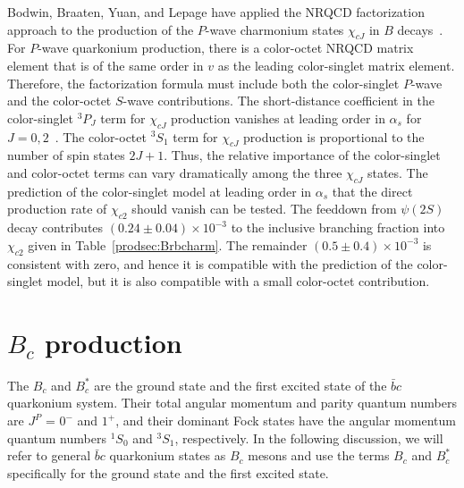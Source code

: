 Bodwin, Braaten, Yuan, and Lepage have applied the NRQCD factorization
approach to the production of the $P$-wave charmonium states $\chi_{cJ}$
in $B$ decays~\cite{Bodwin:1992qr}. For $P$-wave quarkonium production,
there is a color-octet NRQCD matrix element that is of the same order in
$v$ as the leading color-singlet matrix element. Therefore, the
factorization formula must include both the color-singlet $P$-wave and
the color-octet $S$-wave contributions. The short-distance coefficient
in the color-singlet ${}^3P_J$ term for $\chi_{cJ}$ production
vanishes at leading order in $\alpha_s$ for
$J=0,2$~\cite{Kuhn:1979zb,Kuhn:1983ar}. The color-octet ${}^3S_1$ term
for $\chi_{cJ}$ production is proportional to the number of spin
states $2J+1$. Thus, the relative importance of the color-singlet and
color-octet terms can vary dramatically among the three $\chi_{cJ}$
states.  The prediction of the color-singlet model at leading order 
in $\alpha_s$ that the direct production rate of $\chi_{c2}$ should 
vanish can be tested. 
The feeddown from $\psi(2S)$ decay contributes 
$(0.24 \pm 0.04) \times 10^{-3}$ to the
inclusive branching fraction into $\chi_{c2}$ given in
Table~\ref{prodsec:Brbcharm}.  The remainder 
$(0.5 \pm 0.4) \times 10^{-3}$ is consistent with zero, 
and hence it is compatible with the prediction of the
color-singlet model, but it is also compatible with a small
color-octet contribution.


\section{$B_c$ production}
\label{prodsec:Bc}

The $B_c$ and $B_c^*$ are the ground state and the first excited state
of the $\bar b c$ quarkonium system. Their total angular momentum and
parity quantum numbers are $J^P$ = $0^-$ and $1^+$, and their dominant
Fock states have the angular momentum quantum numbers ${}^1S_0$ and
${}^3S_1$, respectively. In the following discussion, we will refer to
general $\bar b c$ quarkonium states as $B_c$ mesons and use the terms
$B_c$ and $B_c^*$ specifically for the ground state and the first 
excited state.

